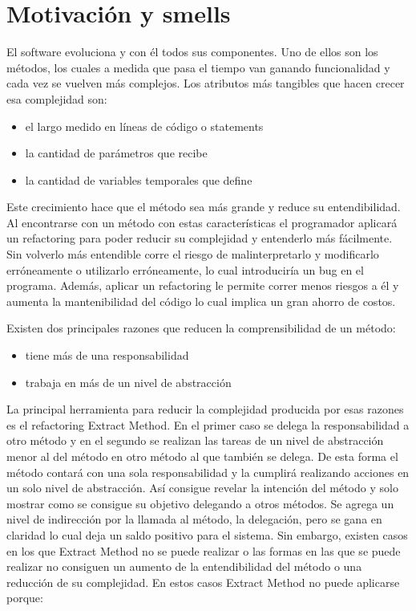 \section{Motivación y smells}
El software evoluciona y con él todos sus componentes. Uno de ellos son los
métodos, los cuales a medida que pasa el tiempo van ganando funcionalidad y cada
vez se vuelven más complejos. Los atributos más tangibles que hacen crecer esa
complejidad son:

\begin{itemize}
    \item el largo medido en líneas de código o statements
    \item la cantidad de parámetros que recibe
    \item la cantidad de variables temporales que define
\end{itemize}

Este crecimiento hace que el método sea más grande y reduce su
entendibilidad. Al encontrarse con un método con estas características el
programador aplicará un refactoring para poder reducir su complejidad y
entenderlo más fácilmente. Sin volverlo más entendible corre el riesgo de
malinterpretarlo y modificarlo erróneamente o utilizarlo erróneamente, lo cual
introduciría un bug en el programa. Además, aplicar un refactoring le permite
correr menos riesgos a él y aumenta la mantenibilidad del código lo cual implica
un gran ahorro de costos.

Existen dos principales razones que reducen la comprensibilidad de un método:

\begin{itemize}
    \item tiene más de una responsabilidad
    \item trabaja en más de un nivel de abstracción
\end{itemize}

La principal herramienta para reducir la complejidad producida por esas razones
es el refactoring Extract Method. En el primer caso se delega la responsabilidad
a otro método y en el segundo se realizan las tareas de un nivel de abstracción
menor al del método en otro método al que también se delega. De esta forma el
método contará con una sola responsabilidad y la cumplirá realizando acciones en
un solo nivel de abstracción. Así consigue revelar la intención del método y
solo mostrar como se consigue su objetivo delegando a otros métodos. Se agrega
un nivel de indirección por la llamada al método, la delegación, pero se gana en
claridad lo cual deja un saldo positivo para el sistema. Sin embargo, existen
casos en los que Extract Method no se puede realizar o las formas en las que se
puede realizar no consiguen un aumento de la entendibilidad del método o una
reducción de su complejidad. En estos casos Extract Method no puede aplicarse
porque:

